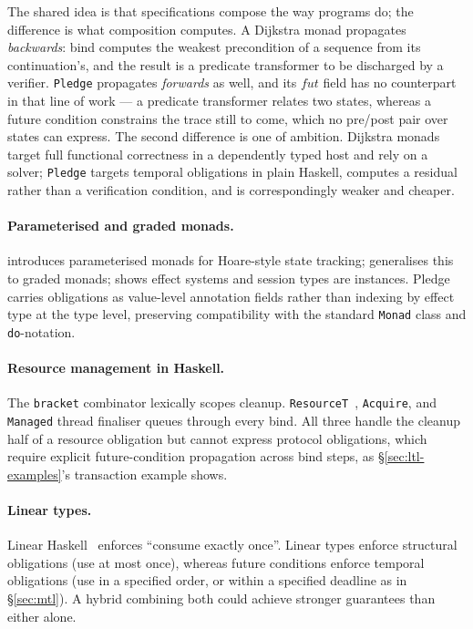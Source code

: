 \documentclass[acmsmall,screen]{acmart}
\newcommand{\fut}{\mathit{fut}}
\begin{document}
The shared idea is that specifications compose the way programs do; the
difference is what composition computes.
A Dijkstra monad propagates \emph{backwards}: bind computes the weakest
precondition of a sequence from its continuation's, and the result is a
predicate transformer to be discharged by a verifier.
\lstinline{Pledge} propagates \emph{forwards} as well, and its $\fut$ field
has no counterpart in that line of work --- a predicate transformer relates
two states, whereas a future condition constrains the trace still to come,
which no pre/post pair over states can express.
The second difference is one of ambition.
Dijkstra monads target full functional correctness in a dependently typed
host and rely on a solver; \lstinline{Pledge} targets temporal obligations
in plain Haskell, computes a residual rather than a verification condition,
and is correspondingly weaker and cheaper.

\paragraph{Parameterised and graded monads.}
\citet{atkey2009} introduces parameterised monads for Hoare-style state
tracking; \citet{katsumata2014} generalises this to graded monads;
\citet{orchard2016} shows effect systems and session types are instances.
Pledge carries obligations as value-level annotation fields rather than
indexing by effect type at the type level, preserving compatibility with the
standard \lstinline{Monad} class and \lstinline{do}-notation.

\paragraph{Resource management in Haskell.}
The \lstinline{bracket} combinator lexically scopes cleanup.
\lstinline{ResourceT}~\cite{snoyman2011resourcet}, \lstinline{Acquire}, and
\lstinline{Managed} thread finaliser queues through every bind.
All three handle the cleanup half of a resource obligation but cannot express
protocol obligations, which require explicit future-condition propagation
across bind steps, as \S\ref{sec:ltl-examples}'s transaction example shows.

\paragraph{Linear types.}
Linear Haskell~\cite{bernardy2018linear} enforces ``consume exactly once''.
Linear types enforce structural obligations (use at most once), whereas
future conditions enforce temporal obligations (use in a specified order,
or within a specified deadline as in \S\ref{sec:mtl}).
A hybrid combining both could achieve stronger guarantees than either alone.
\end{document}
